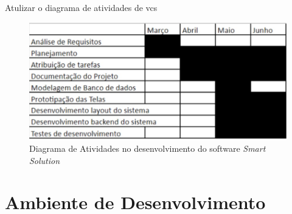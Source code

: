 {\color{red} Atulizar o diagrama de atividades de vcs}

\begin{figure}[H]
	\caption{\label{diagramaDeAtividades}Diagrama de Atividades no desenvolvimento do software \textit{Smart Solution}}
	\begin{center}
		\includegraphics[scale=0.72 ]{./Figuras/diagramaDeAtividades}
		
	\end{center}
\end{figure}
\newpage
\section{Ambiente de Desenvolvimento}



